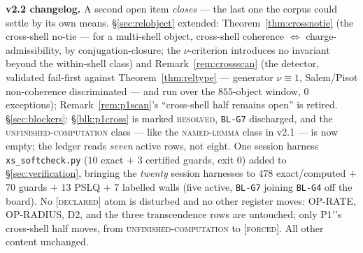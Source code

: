 \documentclass[11pt]{article}
\newcommand{\tagF}{\textcolor{cF}{\textsc{[forced]}}}
\newcommand{\tagD}{\textcolor{cD}{\textsc{[declared]}}}
\newcommand{\hx}[1]{\textcolor{cC}{\footnotesize\texttt{#1}}}
\theoremstyle{plain}
\theoremstyle{definition}
\theoremstyle{remark}
\begin{document}
\smallskip\noindent
\textbf{v2.2 changelog.} A second open item \emph{closes} --- the last one the
corpus could settle by its own means. \S\ref{sec:relobject} extended:
Theorem~\ref{thm:crossnotie} (the cross-shell no-tie --- for a multi-shell object,
cross-shell coherence $\iff$ charge-admissibility, by conjugation-closure; the
$\nu$-criterion introduces no invariant beyond the within-shell class) and
Remark~\ref{rem:crossscan} (the detector, validated fail-first against
Theorem~\ref{thm:reltype} --- generator $\nu\equiv1$, Salem/Pisot non-coherence
discriminated --- and run over the $855$-object window, $0$ exceptions);
Remark~\ref{rem:p1scan}'s ``cross-shell half remains open'' is retired.
\S\ref{sec:blockers}: \S\ref{blk:p1cross} is marked \textsc{resolved}, \hx{BL-G7}
discharged, and the \textsc{unfinished-computation} class --- like the
\textsc{named-lemma} class in v2.1 --- is now empty; the ledger reads \emph{seven}
active rows, not eight. One session harness \texttt{xs\_softcheck.py} ($10$ exact
$+$ $3$ certified guards, exit 0) added to \S\ref{sec:verification}, bringing the
\emph{twenty} session harnesses to $478$ exact/computed $+$ $70$ guards $+$ $13$
PSLQ $+$ $7$ labelled walls (five active, \hx{BL-G7} joining \hx{BL-G4} off the
board). No \tagD{} atom is disturbed and no other register moves: OP-RATE,
OP-RADIUS, D2, and the three transcendence rows are untouched; only P1$'$'s
cross-shell half moves, from \textsc{unfinished-computation} to \tagF{}. All other
content unchanged.
\end{document}
